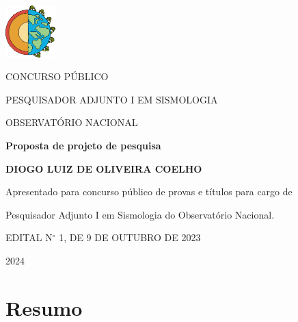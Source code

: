\documentclass[10pt,a4paper,oneside]{book}
\newcommand{\Year}{2024}
\newcommand{\Author}{Diogo Luiz de Oliveira Coelho}
\begin{document}
\pagestyle{plain}
\frontmatter

\begin{titlepage}
  \begin{center}
    \includegraphics[height=2cm]{images/logo_terra.png}
    \vspace{1cm}

    CONCURSO PÚBLICO
    
    PESQUISADOR ADJUNTO I EM SISMOLOGIA
    
    OBSERVATÓRIO NACIONAL

    \vspace{5cm}

    \textbf{\LARGE Proposta de projeto de pesquisa}
    \vspace{1cm}

    \textbf{\LARGE \MakeUppercase{\Author{}}}
    \vspace{5cm}

    {\small
	Apresentado para concurso público de provas e títulos para cargo de

	Pesquisador Adjunto I em Sismologia do Observatório Nacional.
      \vspace{1cm}

	EDITAL N$^{\circ}$   1, DE 9 DE OUTUBRO DE 2023
    }
    \vfill

    \Year{}
  \end{center}
\end{titlepage}

\chapter*{Resumo}
\end{document}
